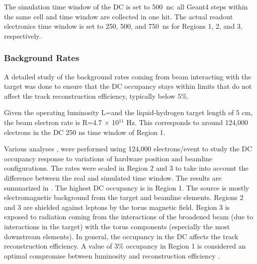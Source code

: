 The simulation time window of the DC is set to 500~ns: all Geant4 steps within the same cell and time window are
collected in one hit.
The actual readout electronics time window is set to 250, 500, and 750~ns for Regions 1, 2, and 3, respectively.


\subsubsection{Background Rates}

A detailed study of the background rates coming from beam interacting with the target was done to ensure that
the DC occupancy stays within limits that do not affect the track reconstruction efficiency, typically below $5\%$.

Given the operating luminosity L=\cLuminosity and the liquid-hydrogen target length of 5 cm, the beam electron rate
is R=4.7 $\times$ 10$^{11}$ Hz. This corresponds to around 124,000 electrons in the DC 250 ns time window of Region 1.

Various analyses \cite{targetStudy, clas12Beamline, clas12Background}, were performed using 124,000 electrons/event
to study the DC occupancy response to variations of hardware position and beamline configurations.
The rates were scaled in Region 2 and 3 to take into account the difference between the real and simulated time window.
The results are summarized in . The highest DC occupancy is in Region 1.
The source is mostly electromagnetic background from the target and beamline elements.
Regions 2 and 3 are shielded against leptons by the torus magnetic field.
Region 3 is exposed to radiation coming from the interactions of the broadened beam
(due to interactions in the target) with the torus components (especially the most downstream elements).
In general, the occupancy in the DC affects the track reconstruction efficiency. A value of 3$\%$ occupancy in Region 1
is considered an optimal compromise between luminosity and reconstruction efficiency \cite{recon-nim}.

